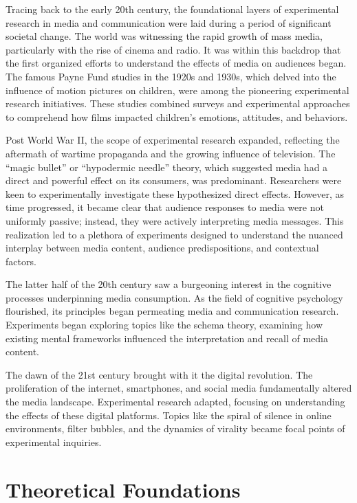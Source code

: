 \documentclass[
  b5paper]{book}
\begin{document}
Tracing back to the early 20th century, the foundational layers of experimental research in media and communication were laid during a period of significant societal change. The world was witnessing the rapid growth of mass media, particularly with the rise of cinema and radio. It was within this backdrop that the first organized efforts to understand the effects of media on audiences began. The famous Payne Fund studies in the 1920s and 1930s, which delved into the influence of motion pictures on children, were among the pioneering experimental research initiatives. These studies combined surveys and experimental approaches to comprehend how films impacted children's emotions, attitudes, and behaviors.

Post World War II, the scope of experimental research expanded, reflecting the aftermath of wartime propaganda and the growing influence of television. The ``magic bullet'' or ``hypodermic needle'' theory, which suggested media had a direct and powerful effect on its consumers, was predominant. Researchers were keen to experimentally investigate these hypothesized direct effects. However, as time progressed, it became clear that audience responses to media were not uniformly passive; instead, they were actively interpreting media messages. This realization led to a plethora of experiments designed to understand the nuanced interplay between media content, audience predispositions, and contextual factors.

The latter half of the 20th century saw a burgeoning interest in the cognitive processes underpinning media consumption. As the field of cognitive psychology flourished, its principles began permeating media and communication research. Experiments began exploring topics like the schema theory, examining how existing mental frameworks influenced the interpretation and recall of media content.

The dawn of the 21st century brought with it the digital revolution. The proliferation of the internet, smartphones, and social media fundamentally altered the media landscape. Experimental research adapted, focusing on understanding the effects of these digital platforms. Topics like the spiral of silence in online environments, filter bubbles, and the dynamics of virality became focal points of experimental inquiries.

\hypertarget{theoretical-foundations-2}{%
\section{Theoretical Foundations}\label{theoretical-foundations-2}}
\end{document}
